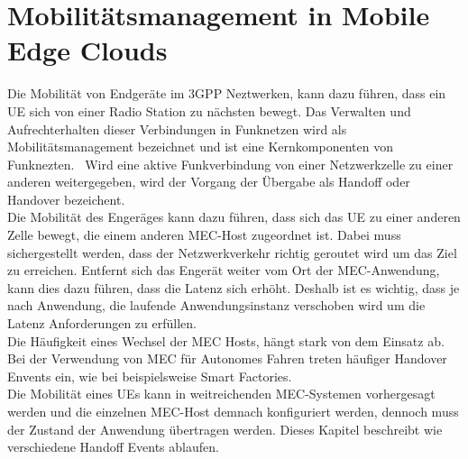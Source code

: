 \documentclass[runningheads]{llncs}
\numberwithin{figure}{section}
\begin{document}
\newpage
\section{Mobilitätsmanagement in Mobile Edge Clouds}
\label{sec:Mobilitätsmanagement}
Die Mobilität von Endgeräte im 3GPP Neztwerken, kann dazu führen, dass ein UE sich von einer 
Radio Station zu nächsten bewegt. Das Verwalten und Aufrechterhalten dieser Verbindungen in Funknetzen wird
als Mobilitätsmanagement bezeichnet und ist eine Kernkomponenten von Funknezten. 
Wird eine aktive Funkverbindung von einer Netzwerkzelle zu einer anderen weitergegeben, wird der Vorgang
der Übergabe als Handoff oder Handover bezeichent.\\
Die Mobilität des Engeräges kann dazu führen, 
dass sich das UE zu einer anderen Zelle bewegt, 
die einem anderen MEC-Host zugeordnet ist. Dabei muss sichergestellt werden, dass der Netzwerkverkehr
richtig geroutet wird um das Ziel zu erreichen.
Entfernt sich das Engerät weiter vom Ort der MEC-Anwendung, 
kann dies dazu führen, dass die Latenz sich erhöht. Deshalb ist es wichtig, dass je nach Anwendung,
die laufende Anwendungsinstanz verschoben wird um die Latenz Anforderungen zu erfüllen. \\
Die Häufigkeit eines Wechsel der MEC Hosts, hängt stark von dem 
Einsatz ab. Bei der Verwendung von MEC für Autonomes Fahren treten häufiger Handover Envents ein, wie bei
beispielsweise Smart Factories.\\
Die Mobilität eines UEs kann in weitreichenden MEC-Systemen vorhergesagt werden und die einzelnen MEC-Host demnach konfiguriert werden,
dennoch muss der Zustand der Anwendung übertragen werden.
Dieses Kapitel beschreibt wie verschiedene Handoff Events ablaufen.
\end{document}
